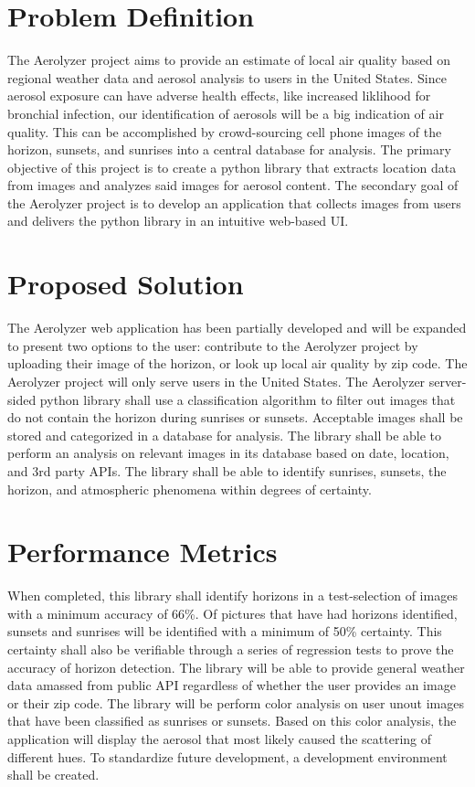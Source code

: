 \documentclass[letterpaper,10pt,draftclsnofoot,onecolumn]{IEEEtran}
\begin{document}
\clearpage
\begin{flushleft}
\section{Problem Definition}
The Aerolyzer project aims to provide an estimate of local air quality based on regional weather data and aerosol analysis to users in the United States. Since aerosol exposure can have adverse health effects, like increased liklihood for bronchial infection, our identification of aerosols will be a big indication of air quality. This can be accomplished by crowd-sourcing cell phone images of the horizon, sunsets, and sunrises into a central database for analysis. The primary objective of this project is to create a python library that extracts location data from images and analyzes said images for aerosol content. The secondary goal of the Aerolyzer project is to develop an application that collects images from users and delivers the python library in an intuitive web-based UI. 

\section{Proposed Solution}
The Aerolyzer web application has been partially developed and will be expanded to present two options to the user: contribute to the Aerolyzer project by uploading their image of the horizon, or look up local air quality by zip code. The Aerolyzer project will only serve users in the United States. The Aerolyzer server-sided python library shall use a classification algorithm to filter out images that do not contain the horizon during sunrises or sunsets. Acceptable images shall be stored and categorized in a database for analysis. The library shall be able to perform an analysis on relevant images in its database based on date, location, and 3rd party APIs. The library shall be able to identify sunrises, sunsets, the horizon, and atmospheric phenomena within degrees of certainty.

\section{Performance Metrics} 
When completed, this library shall identify horizons in a test-selection of images with a minimum accuracy of 66\%. Of pictures that have had horizons identified, sunsets and sunrises will be identified with a minimum of 50\% certainty. This certainty shall also be verifiable through a series of regression tests to prove the accuracy of horizon detection. The library will be able to provide general weather data amassed from public API regardless of whether the user provides an image or their zip code. The library will be perform color analysis on user unout images that have been classified as sunrises or sunsets. Based on this color analysis, the application will display the aerosol that most likely caused the scattering of different hues. To standardize future development, a development environment shall be created.


\end{flushleft}
\end{document}
